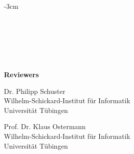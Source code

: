 \begin{titlepage}
    \begin{addmargin}[-1cm]{-3cm}
    \begin{center}
        \large  


        {\myUni} \\
        {\myFaculty} \\
        {\myInstitute}

        \vfill

        \begingroup
            \color{Maroon}\spacedallcaps{\myTitle} \\ \bigskip
        \endgroup
        \mySubtitle \\ \bigskip

        \spacedlowsmallcaps{\myName}

        \vfill

        {\small\bf Reviewers} \\ [0.5cm]
        \parbox{7cm}%
        {
          \begin{center}
            {Dr. Philipp Schuster}\\[1ex]
            {\footnotesize Wilhelm-Schickard-Institut für Informatik\\[-1ex]Universität Tübingen}
          \end{center}}\hfill\parbox{7cm}%
        {
          \begin{center}
          {Prof. Dr. Klaus Ostermann}\\[1ex]
          {\footnotesize Wilhelm-Schickard-Institut für Informatik\\[-1ex]Universität Tübingen}
          \end{center}
        }
        \\ \bigskip\bigskip
        {\small\myTime}
    \end{center}
  \end{addmargin}
\end{titlepage}
